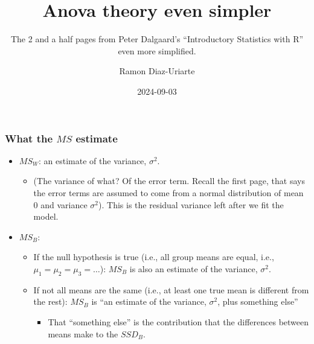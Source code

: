 \documentclass[bigger]{beamer}
\author{Ramon Diaz-Uriarte}
\date{2024-09-03}
\title{Anova theory even simpler}
\subtitle{The 2 and a half pages from Peter Dalgaard's ``Introductory Statistics with R'' even more simplified.}
\begin{document}
 \maketitle







\begin{frame}
  \frametitle{What the $MS$ estimate}
  \begin{itemize}
  \item $MS_W$: an estimate of the variance, $\sigma^2$.
    \begin{itemize}
    \item {\tiny (The variance of what? Of the error term. Recall the
        first page, that says the error terms are assumed to come from a normal  distribution of mean 0 and variance $\sigma^2$). This is the residual variance left after we fit the model.}
    \end{itemize}

    \vspace*{20pt}
  \item $MS_B$:
    \begin{itemize}
    \item If the null hypothesis is true (i.e., all group means are equal, i.e.,
      $\mu_1 = \mu_2 = \mu_3 = \ldots$): $MS_B$ is also an estimate of the variance,
      $\sigma^2$.
          \vspace*{10pt}
    \item If not all means are the same (i.e., at least one true mean is
      different from the rest):  $MS_B$ is ``an estimate of the
      variance, $\sigma^2$, plus something else''
      \begin{itemize}
      \item That ``something else'' is the contribution that the differences
        between means make to the $SSD_B$.
      \end{itemize}
    \end{itemize}
  \end{itemize}
\end{frame}
\end{document}
